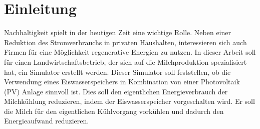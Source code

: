 \chapter{Einleitung}
Nachhaltigkeit spielt in der heutigen Zeit eine wichtige Rolle. Neben einer Reduktion des Stromverbrauchs in privaten Haushalten, interessieren sich auch Firmen für eine Möglichkeit regenerative Energien zu nutzen. In dieser Arbeit soll für einen Landwirtschaftsbetrieb, der sich auf die Milchproduktion spezialisiert hat, ein Simulator erstellt werden. Dieser Simulator soll feststellen, ob die Verwendung eines Eiswasserspeichers in Kombination von einer Photovoltaik (PV) Anlage sinnvoll ist. Dies soll den eigentlichen Energieverbrauch der Milchkühlung reduzieren, indem der Eiswasserspeicher vorgeschalten wird. Er soll die Milch für den eigentlichen Kühlvorgang vorkühlen und dadurch den Energieaufwand reduzieren.